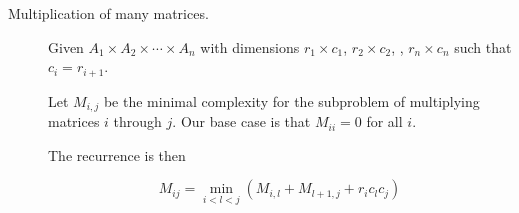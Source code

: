 \documentclass{article}
\begin{document}
\begin{description}
    \item[Multiplication of many matrices.] Given $A_1 \times A_2 \times \cdots
        \times A_n$ with dimensions $r_1\times c_1$, $r_2\times c_2$, \cdots,
        $r_n\times c_n$ such that $c_i = r_{i+1}$.

        Let $M_{i,j}$ be the minimal complexity for the subproblem of multiplying matrices $i$ through $j$. Our base case is that $M_{ii} = 0$ for all $i$.

        The recurrence is then

        \begin{equation}
            M_{ij} = \min_{i < l < j} (M_{i,l} + M_{l+1,j} + r_i c_l c_j)
            \label{eqn:recursionmatrixmult}
        \end{equation}

\end{description}
\end{document}
